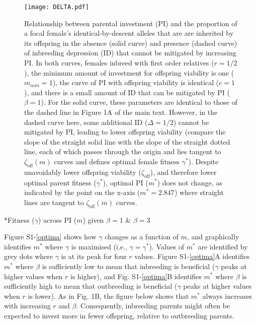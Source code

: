 \documentclass[12pt]{article}
\makeatletter
\renewcommand\section{\@startsection{section}{1}{0in}{-0.5\baselineskip}{0.1\baselineskip}{\normalfont\large\bfseries}}
\makeatother
\begin{document}
\begin{figure}
\begin{center}				
\texttt{[image: DELTA.pdf]}
\end{center}
\caption{Relationship between parental investment (PI) and the proportion of a focal female's identical-by-descent alleles that are are inherited by its offspring in the absence (solid curve) and presence (dashed curve) of inbreeding depression (ID) that cannot be mitigated by increasing PI. In both curves, females inbreed with first order relatives ($r=1/2$), the minimum amount of investment for offspring viability is one ($m_{min}=1$), the curve of PI with offspring viability is identical ($c=1$), and there is a small amount of ID that can be mitigated by PI ($\beta=1$). For the solid curve, these parameters are identical to those of the dashed line in Figure 1A of the main text. However, in the dashed curve here, some additional ID ($\Delta=1/2$) cannot be mitigated by PI, leading to lower offspring viability (compare the slope of the straight solid line with the slope of the straight dotted line, each of which passes through the origin and lies tangent to $\zeta_{\textrm{off}}(m)$ curves and defines optimal female fitness $\gamma^{*}$). Despite unavoidably lower offspring viability ($\zeta_{\textrm{off}}$), and therefore lower optimal parent fitness ($\gamma^{*}$), optimal PI ($m^{*}$) does not change, as indicated by the point on the x-axis ($m^{*}=2.847$) where straight lines are tangent to $\zeta_{\textrm{off}}(m)$ curves.}
\label{DELTA}
\end{figure}

\clearpage

\section*{Fitness ($\gamma$) across PI ($m$) given $\beta=1$ \& $\beta=3$}

\noindent Figure S1-\ref{optima} shows how $\gamma$ changes as a function of $m$, and graphically identifies $m^{*}$ where $\gamma$ is maximised (i.e., $\gamma = \gamma^{*}$). Values of $m^{*}$ are identified by grey dots where $\gamma$ is at its peak for four $r$ values. Figure S1-\ref{optima}A identifies $m^{*}$ where $\beta$ is sufficiently low to mean that inbreeding is beneficial ($\gamma$ peaks at higher values when $r$ is higher), and Fig. S1-\ref{optima}B identifies $m^{*}$ where $\beta$ is sufficiently high to mean that outbreeding is beneficial ($\gamma$ peaks at higher values when $r$ is lower). As in Fig. 1B, the figure below shows that $m^{*}$ always increases with increasing $r$ and $\beta$. Consequently, inbreeding parents might often be expected to invest more in fewer offspring, relative to outbreeding parents.
\end{document}
